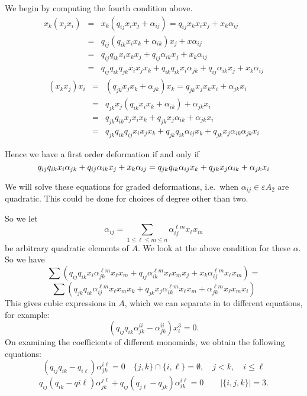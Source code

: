 \documentclass{article}
\begin{document}
We begin by computing the fourth condition above.
\begin{eqnarray*}
  x_k(x_jx_i) 
& = & x_k(q_{ij} x_ix_j + \alpha_{ij}) = q_{ij} x_kx_ix_j+ x_k \alpha_{ij} \\
& = & q_{ij} (q_{ik}x_ix_k + \alpha_{ik})x_j +x\alpha_{ij}\\
& = & q_{ij}q_{ik}x_ix_kx_j +q_{ij}\alpha_{ik} x_j + x_k \alpha_{ij}\\
& = & q_{ij}q_{ik}q_{jk} x_ix_jx_k + q_{ik}q_{ik}x_i\alpha_{jk} + q_{ij}\alpha_{ik}x_j + x_k\alpha_{ij}
\end{eqnarray*}
\begin{eqnarray*}
(x_kx_j)x_i
& = & (q_{jk} x_jx_k + \alpha_{jk})x_k = q_{jk} x_jx_kx_i+ \alpha_{jk}x_i \\
& = & q_{jk}x_j(q_{ik}x_ix_k+\alpha_{ik}) + \alpha_{jk}x_i \\
& = & q_{jk}q_{ik}x_jx_ix_k+q_{jk}x_j\alpha_{ik}+\alpha_{jk}x_i \\
& = & q_{jk}q_{ik}q_{ij}x_ix_jx_k + q_{jk}q_{ik} \alpha_{ij} x_k +q_{jk}x_j\alpha_{ik} \alpha_{jk}x_i
\end{eqnarray*}

Hence we have a first order deformation if and only if
$$q_{ij}q_{ik}x_i\alpha_{jk}+q_{ij}\alpha_{ik}x_j+x_k\alpha_{ij} \\
= q_{jk}q_{ik} \alpha_{ij}x_k + q_{jk}x_j\alpha_{ik} +\alpha_{jk}x_i$$

We will solve these equations for graded deformations, i.e.~when $\alpha_{ij} \in \varepsilon A_2$ are quadratic.  This could be done for choices of degree other than two.

So we let
$$\alpha_{ij} = \sum_{1 \leq \ell \leq m \leq n} \alpha_{ij}^{\ell m} x_\ell x_m$$
be arbitrary quadratic elements of $A$.  We look at the above condition for these $\alpha$.
So we have 
$$ \sum(q_{ij}q_{ik}x_i\alpha_{jk}^{\ell m} x_\ell x_m+q_{ij}\alpha_{ik}^{\ell m} x_\ell x_mx_j+x_k\alpha_{ij}^{\ell m} x_\ell x_m) = $$ $$\sum( q_{jk}q_{ik} \alpha_{ij}^{\ell m} x_\ell x_mx_k + q_{jk}x_j\alpha_{ik}^{\ell m} x_\ell x_m +\alpha_{jk}^{\ell m} x_\ell x_mx_i)$$
This gives cubic expressions in $A$, which we can separate in to different equations, for example:
$$(q_{ij} q_{ik} \alpha_{jk}^{ii} -\alpha_{jk}^{ii}) x_i^3 = 0.$$
On examining the coefficients of different monomials, we obtain the following
equations:
$$ (q_{ij}q_{ik}-q_{i\ell})\alpha_{jk}^{i\ell} = 0 \quad  \{ j,k \} \cap \{i,\ell\} = \emptyset, \quad  j<k, \quad i \leq \ell$$
  $$ q_{ij}(q_{ik}-q{i\ell}) \alpha_{jk}^{j\ell} + q_{ij}(q_{j\ell}-q_{jk}) \alpha_{ik}^{i\ell} = 0 \quad \quad |\{ i,j,k \}| =3.$$
\end{document}

